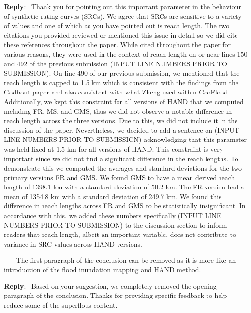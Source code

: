 \documentclass[11pt]{article}
\newcounter{reviewer}
\newcounter{point}[reviewer]
\renewcommand{\thepoint}{P\,\thereviewer.\arabic{point}}
\newenvironment{point}
   {\refstepcounter{point} \bigskip \noindent {\textbf{Reviewer~Point~\thepoint} } ---\ }
   {\par }
\newenvironment{reply}
   {\medskip \noindent \begin{sf}\textbf{Reply}:\  }
   {\medskip \end{sf}}
\begin{document}
\begin{reply}
Thank you for pointing out this important parameter in the behaviour of synthetic rating curves (SRCs).
We agree that SRCs are sensitive to a variety of values and one of which as you have pointed out is reach length.
The two citations you provided reviewed or mentioned this issue in detail so we did cite these references throughout the paper.
While cited throughout the paper for various reasons, they were used in the context of reach length on or near lines 150 and 492 of the previous submission (INPUT LINE NUMBERS PRIOR TO SUBMISSION).
On line 490 of our previous submission, we mentioned that the reach length is capped to 1.5 km which is consistent with the findings from the Godbout paper and also consistent with what Zheng used within GeoFlood.
Additionally, we kept this constraint for all versions of HAND that we computed including FR, MS, and GMS, thus we did not observe a notable difference in reach length across the three versions.
Due to this, we did not include it in the discussion of the paper.
Nevertheless, we decided to add a sentence on (INPUT LINE NUMBERS PRIOR TO SUBMISSION) acknowledging that this parameter was held fixed at 1.5 km for all versions of HAND.
This constraint is very important since we did not find a significant difference in the reach lengths.
To demonstrate this we computed the averages and standard deviations for the two primary versions FR and GMS. 
We found GMS to have a mean derived reach length of 1398.1 km with a standard deviation of 50.2 km.
The FR version had a mean of 1354.8 km with a standard deviation of 249.7 km.
We found this difference in reach lengths across FR and GMS to be statistically insignificant. 
In accordance with this, we added these numbers specifically (INPUT LINE NUMBERS PRIOR TO SUBMISSION) to the discussion section to inform readers that reach length, albeit an important variable, does not contribute to variance in SRC values across HAND versions.
\end{reply}

\begin{point}
The first paragraph of the conclusion can be removed as it is more like an introduction of the flood inundation mapping and HAND method. 
\end{point}

\begin{reply}
Based on your suggestion, we completely removed the opening paragraph of the conclusion.
Thanks for providing specific feedback to help reduce some of the superflous content.
\end{reply}
\end{document}
